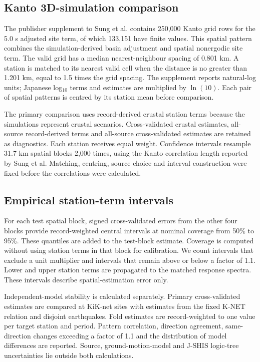 \documentclass[10pt]{article}
\begin{document}
\subsection*{Kanto 3D-simulation comparison}

The publisher supplement to Sung et al. contains 250,000 Kanto grid rows for the 5.0 s adjusted site term, of which 133,151 have finite values\cite{sung2025}. This spatial pattern combines the simulation-derived basin adjustment and spatial nonergodic site term. The valid grid has a median nearest-neighbour spacing of 0.801 km. A station is matched to its nearest valid cell when the distance is no greater than 1.201 km, equal to 1.5 times the grid spacing. The supplement reports natural-log units; Japanese log$_{10}$ terms and estimates are multiplied by $\ln(10)$. Each pair of spatial patterns is centred by its station mean before comparison.

The primary comparison uses record-derived crustal station terms because the simulations represent crustal scenarios. Cross-validated crustal estimates, all-source record-derived terms and all-source cross-validated estimates are retained as diagnostics. Each station receives equal weight. Confidence intervals resample 31.7 km spatial blocks 2,000 times, using the Kanto correlation length reported by Sung et al. Matching, centring, source choice and interval construction were fixed before the correlations were calculated.

\subsection*{Empirical station-term intervals}

For each test spatial block, signed cross-validated errors from the other four blocks provide record-weighted central intervals at nominal coverage from 50\% to 95\%. These quantiles are added to the test-block estimate. Coverage is computed without using station terms in that block for calibration. We count intervals that exclude a unit multiplier and intervals that remain above or below a factor of 1.1. Lower and upper station terms are propagated to the matched response spectra. These intervals describe spatial-estimation error only.

Independent-model stability is calculated separately. Primary cross-validated estimates are compared at KiK-net sites with estimates from the fixed K-NET relation and disjoint earthquakes. Fold estimates are record-weighted to one value per target station and period. Pattern correlation, direction agreement, same-direction changes exceeding a factor of 1.1 and the distribution of model differences are reported. Source, ground-motion-model and J-SHIS logic-tree uncertainties lie outside both calculations.
\end{document}
